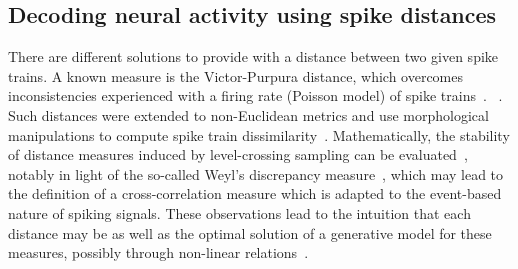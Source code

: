 \documentclass[brainsci, %
               review,submit,pdftex,moreauthors
               ]{Definitions/mdpi}
\begin{document}
\subsection{Decoding neural activity using spike distances}
There are different solutions to provide with a distance between two given spike trains. A known measure is the Victor-Purpura distance, which overcomes inconsistencies experienced with a  firing rate (Poisson model) of spike trains~\citep{victor_nature_1996}. ~\citep{van_rossum_novel_2001}.  Such distances were extended to non-Euclidean metrics and use morphological manipulations to compute spike train dissimilarity~\citep{kreuz_measuring_2007}. Mathematically, the stability of distance measures induced by level-crossing sampling can be evaluated~\citep{moser_stability_2014}, notably in light of the so-called Weyl's discrepancy measure~\citep{weyl_ueber_1916}, which may lead to the definition of a cross-correlation measure  which is adapted to the event-based nature of spiking signals. These observations lead to the intuition that each distance may be as well  as the optimal solution of a generative model for these measures, possibly through non-linear relations~\citep{aronov_non-euclidean_2004}. %
\end{document}
